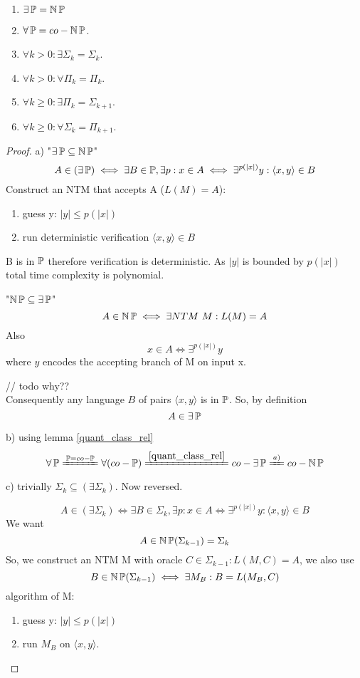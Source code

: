 \begin{theorem}\label{polyn_q}
	\begin{enumerate}[label=\alph*)]
		\item $\exists \operatorname{\mathbb{P}} = \operatorname{\operatorname{\mathbb{N}}\mathbb{P}}$
		\item $\forall \operatorname{\mathbb{P}} = co-\operatorname{\operatorname{\mathbb{N}}\mathbb{P}} $.
		\item $\forall k > 0: \exists \Sigma_k = \Sigma_k$.
		\item $\forall k > 0: \forall \Pi_k= \Pi_k$.
		\item $\forall k \geq 0: \exists \Pi_k = \Sigma_{k + 1}$.
		\item $\forall k \geq 0: \forall \Sigma_k = \Pi_{k + 1}$.
	\end{enumerate}
\end{theorem}
\begin{proof}
	a) "$\exists \operatorname{\mathbb{P}} \subseteq \operatorname{\operatorname{\mathbb{N}}\mathbb{P}}$"
	\[ A \in (\exists \operatorname{\mathbb{P}}) \iff \exists B \in \operatorname{\mathbb{P}}, \exists p: x \in A \iff \exists^{p(|x|)} y: \langle x, y \rangle \in B \]
	Construct an NTM that accepts A ($L(M) = A$):

	\begin{enumerate}
		\item guess y: $|y| \leq p(|x|)$
		\item run deterministic verification $\langle x, y \rangle \in B$
	\end{enumerate}
	B is in $\operatorname{\mathbb{P}}$ therefore verification is deterministic.
	As $|y|$ is bounded by $p(|x|)$ total time complexity is polynomial.

	"$\operatorname{\operatorname{\mathbb{N}}\mathbb{P}} \subseteq \exists \operatorname{\mathbb{P}}$"
	\[ A \in \operatorname{\operatorname{\mathbb{N}}\mathbb{P}} \iff \exists NTM\ M: L(M) = A \]
	Also
	\[ x \in A \iff \exists^{p(|x|)} y \]
	where $y$ encodes the accepting branch of M on input x.

	// todo why??\\
	Consequently any language $B$ of pairs $\langle x, y \rangle$ is in $\operatorname{\mathbb{P}}$.
	So, by definition
	\[ A \in \exists \operatorname{\mathbb{P}} \]

	b) using lemma \cref{quant_class_rel}
	\[ \forall \TP \xlongequal{\TP = co-\TP} \forall(co-\TP) \xlongequal{\cref{quant_class_rel}} co-\exists \TP \xlongequal{a)} co-\TNP \]

	c) trivially $\Sigma_k \subseteq (\exists \Sigma_k)$. Now reversed.

	\[ A \in (\exists \Sigma_k) \iff \exists B \in \Sigma_k, \exists p: x \in A \iff \exists^{p(|x|)} y: \langle x, y \rangle \in B \]
	We want
	\[ A \in \operatorname{\operatorname{\mathbb{N}}\mathbb{P}}(\Sigma_{k - 1}) = \Sigma_k \]
	So, we construct an NTM M with oracle $C \in \Sigma_{k - 1}: L(M, C) = A$, we also use
	\[ B \in \operatorname{\operatorname{\mathbb{N}}\mathbb{P}}(\Sigma_{k - 1}) \iff \exists M_B: B = L(M_B, C) \]
	algorithm of M:
	\begin{enumerate}
		\item guess y: $|y| \leq p(|x|)$
		\item run $M_B$ on $\langle x, y \rangle$.
	\end{enumerate}


\end{proof}
